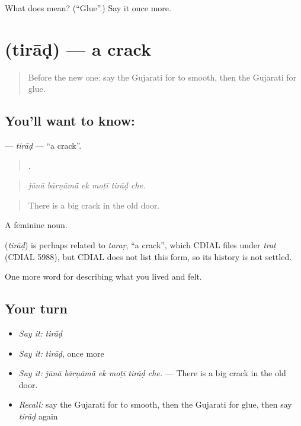 \begin{tcolorbox}[breakable,colback=teal!4,colframe=teal!35!black,title={Before you move on}]
What does  mean? (\textquotedblleft{}Glue\textquotedblright{}.) Say it once more.
\end{tcolorbox}
\section[\texorpdfstring{\gu{તિરાડ} (tirāḍ)}{તિરાડ (tirāḍ)}]{ (tirāḍ) — a crack}

\label{lesson:GU-C503-tirad}



\begin{quote}
Before the new one: say the Gujarati for to smooth, then the Gujarati for glue.
\end{quote}

\subsection*{You'll want to know: }
\textbf{} — \emph{tirāḍ} — \textquotedblleft{}a crack\textquotedblright{}.

\begin{quote}
     .
\end{quote}

\begin{quote}
\emph{jūnā bārṇāmā̃ ek moṭī tirāḍ che.}
\end{quote}

\begin{quote}
There is a big crack in the old door.
\end{quote}

A feminine noun.

\begin{cousinweb}
\textbf{} (\emph{tirāḍ}) is perhaps related to \emph{taraṛ}, \textquotedblleft{}a crack\textquotedblright{}, which CDIAL files under \emph{traṭ} (CDIAL 5988), but CDIAL does not list this form, so its history is not settled.
\end{cousinweb}

\begin{grammarlens}[title={What you've built}]
One more word for describing what you lived and felt.
\end{grammarlens}

\subsection*{Your turn}
\begin{itemize}
\raggedright
  \item \emph{Say it:} \emph{tirāḍ}
  \item \emph{Say it:} \emph{tirāḍ}, once more
  \item \emph{Say it:} \emph{jūnā bārṇāmā̃ ek moṭī tirāḍ che.} — There is a big crack in the old door.
  \item \emph{Recall:} say the Gujarati for to smooth, then the Gujarati for glue, then say \emph{tirāḍ} again
\end{itemize}


